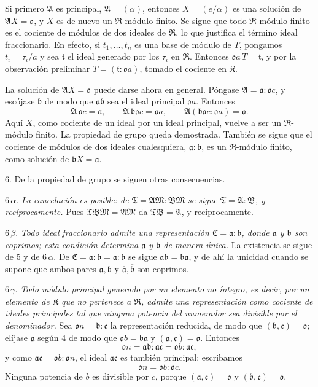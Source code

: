 \documentclass[11pt]{article}
\providecommand{\mR}{\mathfrak{R}}
\providecommand{\mK}{\mathfrak{K}}
\providecommand{\mbar}[1]{\overline{#1}}
\providecommand{\ma}{\mathfrak{a}}
\providecommand{\mb}{\mathfrak{b}}
\providecommand{\mc}{\mathfrak{c}}
\providecommand{\mo}{\mathfrak{o}}
\providecommand{\mt}{\mathfrak{t}}
\begin{document}
Si primero $\mathfrak A$ es principal, $\mathfrak A=(\alpha)$, entonces $X=(e/\alpha)$ es una solución de $\mathfrak A X=\mo$, y $X$ es de nuevo un $\mR$-módulo finito. Se sigue que todo $\mR$-módulo finito es el cociente de módulos de dos ideales de $\mR$, lo que justifica el término ideal fraccionario. En efecto, si $t_1,\ldots,t_n$ es una base de módulo de $T$, pongamos $t_i=\tau_i/a$ y sea $\mt$ el ideal generado por los $\tau_i$ en $\mR$. Entonces $\mo a\,T=\mt$, y por la observación preliminar $T=(\mt:\mo a)$, tomado el cociente en $\mK$.

La solución de $\mathfrak A X=\mo$ puede darse ahora en general. Póngase $\mathfrak A=\ma:\mo c$, y escójase $\mb$ de modo que $\ma\mb$ sea el ideal principal $\mo a$. Entonces
\[
        \mathfrak A\,\mo c=\ma,
        \qquad \mathfrak A\,\mb\mo c=\mo a,
        \qquad \mathfrak A(\mb\mo c:\mo a)=\mo.
\]
Aquí $X$, como cociente de un ideal por un ideal principal, vuelve a ser un $\mR$-módulo finito. La propiedad de grupo queda demostrada. También se sigue que el cociente de módulos de dos ideales cualesquiera, $\ma:\mb$, es un $\mR$-módulo finito, como solución de $\mb X=\ma$.

6. De la propiedad de grupo se siguen otras consecuencias.

6\,$\alpha$. \emph{La cancelación es posible: de $\mathfrak T=\mathfrak A\mathfrak M:\mathfrak B\mathfrak M$ se sigue $\mathfrak T=\mathfrak A:\mathfrak B$, y recíprocamente.} Pues $\mathfrak T\mathfrak B\mathfrak M=\mathfrak A\mathfrak M$ da $\mathfrak T\mathfrak B=\mathfrak A$, y recíprocamente.

6\,$\beta$. \emph{Todo ideal fraccionario admite una representación $\mathfrak C=\ma:\mb$, donde $\ma$ y $\mb$ son coprimos; esta condición determina $\ma$ y $\mb$ de manera única.} La existencia se sigue de 5 y de 6\,$\alpha$. De $\mathfrak C=\ma:\mb=\mbar\ma:\mbar\mb$ se sigue $\ma\mbar\mb=\mb\mbar\ma$, y de ahí la unicidad cuando se supone que ambos pares $\ma,\mb$ y $\mbar\ma,\mbar\mb$ son coprimos.

6\,$\gamma$. \emph{Todo módulo principal generado por un elemento no íntegro, es decir, por un elemento de $\mK$ que no pertenece a $\mR$, admite una representación como cociente de ideales principales tal que ninguna potencia del numerador sea divisible por el denominador.} Sea $\mo n=\mb:\mc$ la representación reducida, de modo que $(\mb,\mc)=\mo$; elíjase $\ma$ según 4 de modo que $\mo b=\mb\ma$ y $(\ma,\mc)=\mo$. Entonces
\[
        \mo n=\ma\mb:\ma\mc=\mo b:\ma\mc,
\]
y como $\ma\mc=\mo b:\mo n$, el ideal $\ma\mc$ es también principal; escribamos
\[
        \mo n=\mo b:\mo c.
\]
Ninguna potencia de $b$ es divisible por $c$, porque $(\ma,\mc)=\mo$ y $(\mb,\mc)=\mo$.
\end{document}
